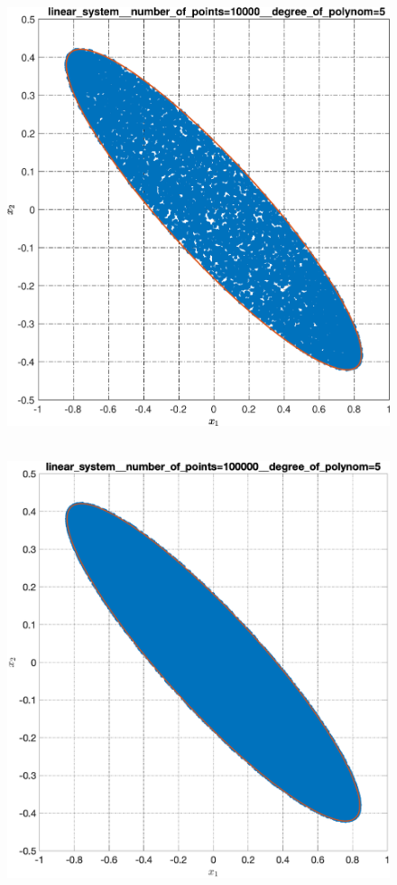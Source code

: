 \documentclass[../main.tex]{subfiles}
\begin{document}
\begin{figure}[ht!]
\begin{minipage}[b]{.4\linewidth}
  		\includegraphics[width=\linewidth]{images/linear_system__number_of_points=10000__degree_of_polynom=5.eps}
  	\end{minipage} 
  	\vfill
  	\hspace{-2.5ex}
  	\begin{minipage}[b]{.4\linewidth} 
  		\small
  		\centering 
  		\includegraphics[width=\linewidth]{images/linear_system__number_of_points=100000__degree_of_polynom=5.eps}

\end{minipage}
\end{figure}
\end{document}
